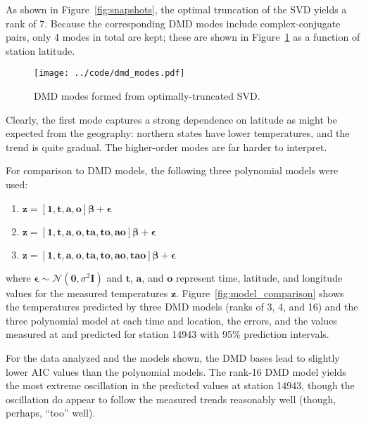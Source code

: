 \documentclass[review,number,sort&compress,12pt]{elsarticle}
\begin{document}
As shown in Figure~\ref{fig:snapshots}, the optimal truncation of the SVD yields a rank of 7.  Because the corresponding DMD modes include complex-conjugate pairs, only 4 modes in total are kept; these are shown in Figure~\ref{fig:dmd_modes} as a function of station latitude.
\begin{figure}[h]
 \centering
 \texttt{[image: ../code/dmd\_modes.pdf]}\\
   \caption{DMD modes formed from optimally-truncated SVD.}
  \label{fig:dmd_modes}
\end{figure}
Clearly, the first mode captures a strong dependence on latitude as might be expected from the geography: northern states have lower temperatures, and the trend is quite gradual.  The higher-order modes are far harder to interpret.

For comparison to DMD models, the following three polynomial models were used:
\begin{enumerate}
 \item $\mathbf{z} = [\mathbf{1}, \mathbf{t}, \mathbf{a}, \mathbf{o}]\boldsymbol{\beta} + \boldsymbol{\epsilon}$
  \item $\mathbf{z} = [\mathbf{1}, \mathbf{t}, \mathbf{a}, \mathbf{o}, \mathbf{ta}, \mathbf{to}, \mathbf{ao}]\boldsymbol{\beta} + \boldsymbol{\epsilon}$
  \item $\mathbf{z} = [\mathbf{1}, \mathbf{t}, \mathbf{a}, \mathbf{o}, \mathbf{ta}, \mathbf{to}, \mathbf{ao}, \mathbf{tao}]\boldsymbol{\beta} + \boldsymbol{\epsilon}$
\end{enumerate}
where $\boldsymbol{\epsilon}\sim \mathcal{N}(\mathbf{0},\sigma^2 \mathbf{I})$ and $\mathbf{t}$, $\mathbf{a}$, and $\mathbf{o}$ represent time, latitude, and longitude values for the measured temperatures $\mathbf{z}$.
Figure~\ref{fig:model_comparison} shows the temperatures predicted by three DMD models (ranks of 3, 4, and 16) and the three polynomial model at each time and location, the errors, and the values measured at and predicted for station 14943 with 95\% prediction intervals.

For the data analyzed and the models shown, the DMD bases lead to slightly lower AIC values than the polynomial models.  The rank-16 DMD model yields the most extreme oscillation in the predicted values at station 14943, though the oscillation do appear to follow the measured trends reasonably well (though, perhaps, ``too'' well).
\end{document}
